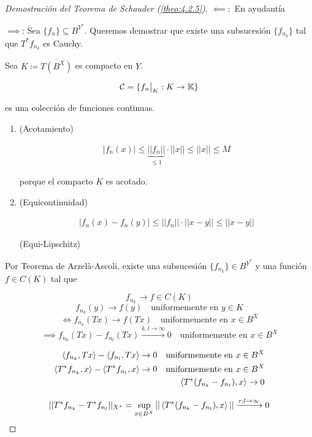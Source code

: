 \begin{proof}[Demostración del Teorema de Schauder (\ref{theo:4.2.5})]
   $\impliedby:$ En ayudantía

   $\implies$: Sea $\{f_n\}\subseteq B^{Y^*}$. Queremos demostrar que existe una subsucesión $\{f_{n_k}\}$ tal que $T^* f_{n_k}$ es Cauchy.

   Sea $K\coloneqq \overline{T(B^X)}$ es compacto en $Y$.

   \[\mathcal{C}=\{f_n\big\rvert_{K}:K\to\mathbb{K}\}\]

   es una colección de funciones continuas.

   \begin{enumerate}
      \item (Acotamiento) 
      
      \begin{align*}
         |f_n(x)|\leq \underbrace{||f_n||}_{\leq 1}\cdot||x||\leq ||x||\leq M
      \end{align*}

      porque el compacto $K$ es acotado.

      \item (Equicontinuidad)
      
      \begin{align*}
         |f_n(x)-f_n(y)|\leq ||f_n||\cdot ||x-y||\leq ||x-y||
      \end{align*}

      (Equi-Lipschitz)
   \end{enumerate}

   Por Teorema de Arzelà-Ascoli, existe una subsucesión $\{f_{n_k}\}\in B^{Y^*}$ y una función $f\in C(K)$ tal que 

   \[f_{n_k}\to f\in C(K)\]
   \[f_{n_k}(y)\to f(y)\quad \text{uniformemente en }y\in K\]
   \[\iff f_{n_k}(Tx)\to f(Tx)\quad\text{uniformemente en }x\in B^X\]
   \[\implies f_{n_k}(Tx)-f_{n_l}(Tx)\xrightarrow{k,l\to\infty} 0\quad\text{uniformemente en }x\in B^X\]

   \begin{align*}
      \left\langle f_{n_k},Tx\right\rangle-\left\langle f_{n_l},Tx\right\rangle\to 0\quad\text{uniformemente en }x\in B^X\\
      \left\langle T^* f_{n_k},x\right\rangle-\left\langle T^*f_{n_l},x\right\rangle\to 0\quad\text{uniformemente en }x\in B^X\\
      \left\langle T^*(f_{n_k}-f_{n_l}),x\right\rangle\to 0
   \end{align*}

   \[||T^*f_{n_k}-T^* f_{n_l}||_{X^*}=\sup_{x\in B^X}||\left\langle T^*(f_{n_k}-f_{n_l}),x\right\rangle||\xrightarrow{r,l\to\infty}0\]
\end{proof}

